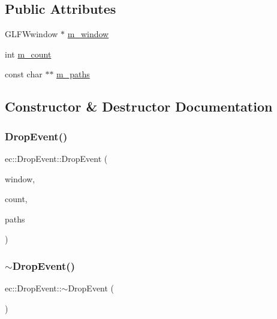 \subsection*{Public Attributes}
\begin{DoxyCompactItemize}
\item 
G\+L\+F\+Wwindow $\ast$ \mbox{\hyperlink{structec_1_1_drop_event_a526c7694184ab65111ca5f8f4f2384fa}{m\+\_\+window}}
\item 
int \mbox{\hyperlink{structec_1_1_drop_event_a63c1174cdefa0a30b15667c9fa070a41}{m\+\_\+count}}
\item 
const char $\ast$$\ast$ \mbox{\hyperlink{structec_1_1_drop_event_ad7bdb28144cd5ccb2c13c4dbacff40cb}{m\+\_\+paths}}
\end{DoxyCompactItemize}


\subsection{Constructor \& Destructor Documentation}
\mbox{\label{structec_1_1_drop_event_a21b2b33aae3ff78510bc2a58e2a7ece3}} 
\subsubsection{\texorpdfstring{Drop\+Event()}{DropEvent()}}
{\footnotesize\ttfamily ec\+::\+Drop\+Event\+::\+Drop\+Event (\begin{DoxyParamCaption}\item[{G\+L\+F\+Wwindow $\ast$}]{window,  }\item[{const int}]{count,  }\item[{const char $\ast$$\ast$}]{paths }\end{DoxyParamCaption})}

\mbox{\label{structec_1_1_drop_event_ad68bca5b7ca0c65690fc85d682d057db}} 
\subsubsection{\texorpdfstring{$\sim$\+Drop\+Event()}{~DropEvent()}}
{\footnotesize\ttfamily ec\+::\+Drop\+Event\+::$\sim$\+Drop\+Event (\begin{DoxyParamCaption}{ }\end{DoxyParamCaption})}



